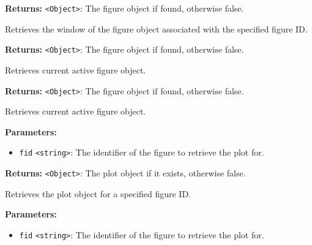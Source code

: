 \documentclass[12pt,a4paper]{article}
\begin{document}
\noindent \textbf{Returns:} \texttt{<Object>}: The figure object if found, otherwise \textasciigrave{}false\textasciigrave{}.

\noindent Retrieves the window of the figure object associated with the specified figure ID.

\vspace{5mm}
\noindent {}


\noindent \textbf{Returns:} \texttt{<Object>}: The figure object if found, otherwise \textasciigrave{}false\textasciigrave{}.

\noindent Retrieves current active figure object.

\vspace{5mm}
\noindent {}


\noindent \textbf{Returns:} \texttt{<Object>}: The figure object if found, otherwise \textasciigrave{}false\textasciigrave{}.

\noindent Retrieves current active figure object.

\vspace{5mm}
\noindent {}


\noindent \textbf{Parameters:}
\begin{itemize}
  \item \texttt{fid} \texttt{<string>}: The identifier of the figure to retrieve the plot for.
\end{itemize}

\noindent \textbf{Returns:} \texttt{<Object>}: The plot object if it exists, otherwise \textasciigrave{}false\textasciigrave{}.

\noindent Retrieves the plot object for a specified figure ID.

\vspace{5mm}
\noindent {}


\noindent \textbf{Parameters:}
\begin{itemize}
  \item \texttt{fid} \texttt{<string>}: The identifier of the figure to retrieve the plot for.
\end{itemize}
\end{document}
